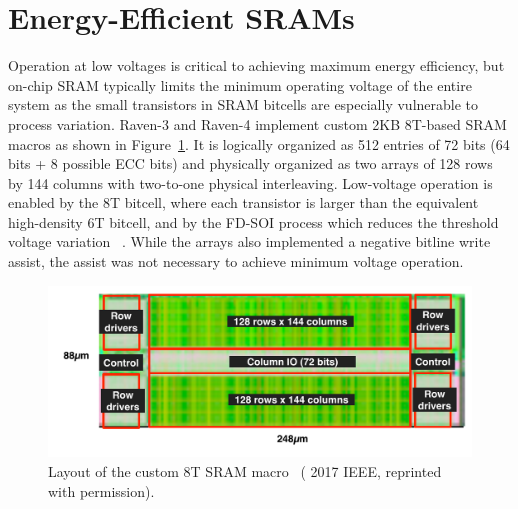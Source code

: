 \documentclass[graybox]{svmult}
\begin{document}


\section{Energy-Efficient SRAMs}

Operation at low voltages is critical to achieving maximum energy efficiency, but on-chip SRAM typically limits the minimum operating voltage of the entire system as the small transistors in SRAM bitcells are especially vulnerable to process variation.
Raven-3 and Raven-4 implement custom 2KB 8T-based SRAM macros as shown in Figure~\ref{fig:sram}.
It is logically organized as 512 entries of 72 bits (64 bits + 8 possible ECC bits) and physically organized as two arrays of 128 rows by 144 columns with two-to-one physical interleaving.
Low-voltage operation is enabled by the 8T bitcell, where each transistor is larger than the equivalent high-density 6T bitcell, and by the FD-SOI process which reduces the threshold voltage variation \cite{planes}~\cite{raven1}.
While the arrays also implemented a negative bitline write assist, the assist was not necessary to achieve minimum voltage operation.

\begin{figure}
  \centering
  \includegraphics[width=\textwidth]{sram}
  \caption{Layout of the custom 8T SRAM macro~\cite{Keller2017} ({\textcopyright} 2017 IEEE, reprinted with permission).}
  \label{fig:sram}
\end{figure}
\end{document}
